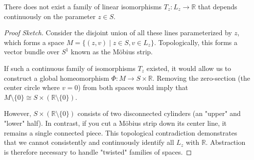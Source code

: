 \begin{center}
\end{center}

\begin{proposition}
  There does not exist a family of linear isomorphisms $T_z \colon L_z \to \mathbb{R}$ that depends continuously on the parameter $z \in S$.
\end{proposition}

\begin{proof}[Proof Sketch]
  Consider the disjoint union of all these lines parameterized by $z$, which forms a space $M = \{ (z, v) \mid z \in S, v \in L_z \}$. Topologically, this forms a vector bundle over $S^1$ known as the Möbius strip.

  If such a continuous family of isomorphisms $T_z$ existed, it would allow us to construct a global homeomorphism $\Phi \colon M \to S \times \mathbb{R}$. Removing the zero-section (the center circle where $v=0$) from both spaces would imply that $M \setminus \{0\} \cong S \times (\mathbb{R} \setminus \{0\})$.

  However, $S \times (\mathbb{R} \setminus \{0\})$ consists of two disconnected cylinders (an "upper" and "lower" half). In contrast, if you cut a Möbius strip down its center line, it remains a single connected piece. This topological contradiction demonstrates that we cannot consistently and continuously identify all $L_z$ with $\mathbb{R}$. Abstraction is therefore necessary to handle "twisted" families of spaces.
\end{proof}

